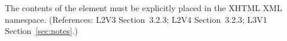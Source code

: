 The contents of the  element must be explicitly placed in the
XHTML XML namespace.  (References: L2V3 Section~3.2.3; L2V4 Section~3.2.3; 
L3V1 Section~\ref{sec:notes}.)
